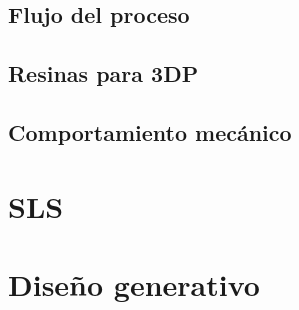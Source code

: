 \subsection{Flujo del proceso}

\subsection{Resinas para 3DP}

\subsection{Comportamiento mecánico}

\section{SLS}

\section{Diseño generativo}